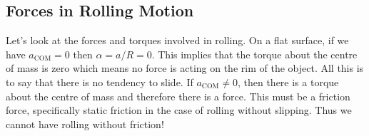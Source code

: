 \documentclass[../classical_mechanics.tex]{subfiles}
\begin{document}
        \subsection{Forces in Rolling Motion}\label{subsec:forces-in-rolling-motion}
            Let's look at the forces and torques involved in rolling.
            On a flat surface, if we have $a_\text{COM}=0$ then $\alpha=a/R=0$.
            This implies that the torque about the centre of mass is zero which means no force is acting on the rim of the object.
            All this is to say that there is no tendency to slide.
            If $a_\text{COM}\neq 0$, then there is a torque about the centre of mass and therefore there is a force.
            This must be a friction force, specifically static friction in the case of rolling without slipping.
            Thus we cannot have rolling without friction!
\end{document}
